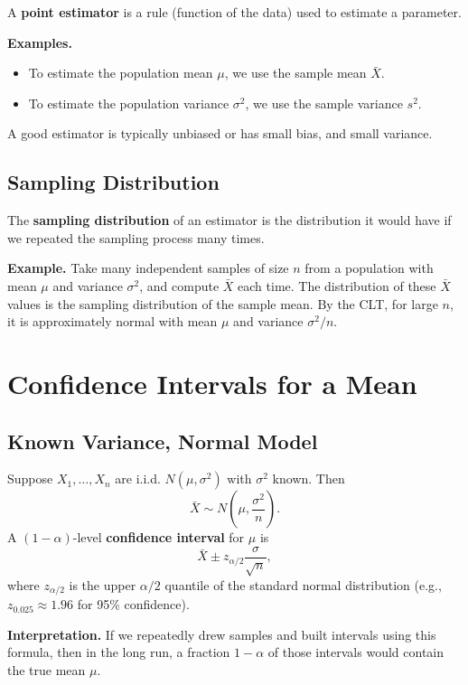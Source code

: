 \documentclass[11pt,a4paper]{article}
\begin{document}
A \textbf{point estimator} is a rule (function of the data) used to estimate a parameter.

\textbf{Examples.}
\begin{itemize}
    \item To estimate the population mean \(\mu\), we use the sample mean \(\bar{X}\).
    \item To estimate the population variance \(\sigma^2\), we use the sample variance \(s^2\).
\end{itemize}

A good estimator is typically unbiased or has small bias, and small variance.

\subsection{Sampling Distribution}

The \textbf{sampling distribution} of an estimator is the distribution it would have if we repeated the sampling process many times.

\textbf{Example.}  
Take many independent samples of size \(n\) from a population with mean \(\mu\) and variance \(\sigma^2\), and compute \(\bar{X}\) each time.  
The distribution of these \(\bar{X}\) values is the sampling distribution of the sample mean.  
By the CLT, for large \(n\), it is approximately normal with mean \(\mu\) and variance \(\sigma^2/n\).

\newpage

\section{Confidence Intervals for a Mean}

\subsection{Known Variance, Normal Model}

Suppose \(X_1,\dots,X_n\) are i.i.d. \(N(\mu,\sigma^2)\) with \(\sigma^2\) known.  
Then
\[
\bar{X} \sim N\left(\mu, \frac{\sigma^2}{n}\right).
\]
A \((1-\alpha)\)-level \textbf{confidence interval} for \(\mu\) is
\[
\bar{X} \pm z_{\alpha/2} \frac{\sigma}{\sqrt{n}},
\]
where \(z_{\alpha/2}\) is the upper \(\alpha/2\) quantile of the standard normal distribution (e.g., \(z_{0.025} \approx 1.96\) for 95\% confidence).

\textbf{Interpretation.}  
If we repeatedly drew samples and built intervals using this formula, then in the long run, a fraction \(1-\alpha\) of those intervals would contain the true mean \(\mu\).
\end{document}
